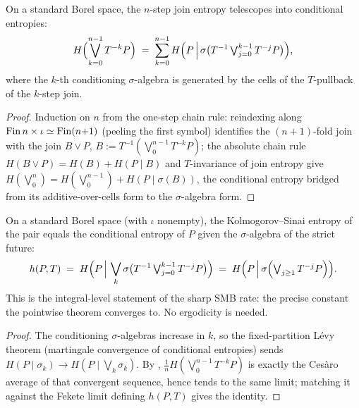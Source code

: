 \begin{theorem}\label{ksEntropySeq_eq_sum_condEntropy}
  \leanok
  On a standard Borel space, the \(n\)-step join entropy telescopes into conditional entropies:
  \[
    H\Bigl(\bigvee_{k=0}^{n-1} T^{-k}P\Bigr)
      \;=\; \sum_{k=0}^{n-1}
        H\Bigl(P \,\Big|\, \sigma\bigl(T^{-1}\textstyle\bigvee_{j=0}^{k-1} T^{-j}P\bigr)\Bigr),
  \]
  where the \(k\)-th conditioning \(\sigma\)-algebra is generated by the cells of the
  \(T\)-pullback of the \(k\)-step join.
\end{theorem}
\begin{proof}\leanok
  Induction on \(n\) from the one-step chain rule: reindexing along
  \(\operatorname{Fin} n \times \iota \simeq \operatorname{Fin}(n{+}1)\) (peeling the first symbol) identifies the
  \((n{+}1)\)-fold join with the join \(B \vee P\), \(B := T^{-1}(\bigvee_0^{n-1}T^{-k}P)\); the
  absolute chain rule \(H(B \vee P) = H(B) + H(P \mid B)\) and \(T\)-invariance of join entropy
  give \(H(\bigvee_0^{n}) = H(\bigvee_0^{n-1}) + H(P \mid \sigma(B))\), the conditional entropy
  bridged from its additive-over-cells form to the \(\sigma\)-algebra form.
\end{proof}

\begin{theorem}\label{ksEntropyPartition_eq_condEntropy_iSup}
  \leanok
  On a standard Borel space (with \(\iota\) nonempty), the Kolmogorov--Sinai entropy of the pair
  equals the conditional entropy of \(P\) given the \(\sigma\)-algebra of the strict future:
  \[
    h(P,T) \;=\; H\Bigl(P \,\Big|\,
      \bigvee_{k}\sigma\bigl(T^{-1}\textstyle\bigvee_{j=0}^{k-1} T^{-j}P\bigr)\Bigr)
      \;=\; H\Bigl(P \,\Big|\, \sigma\Bigl(\bigvee_{j\ge 1} T^{-j}P\Bigr)\Bigr).
  \]
  This is the integral-level statement of the sharp SMB rate: the precise constant the pointwise
  theorem converges to. No ergodicity is needed.
\end{theorem}
\begin{proof}\leanok
  The conditioning \(\sigma\)-algebras increase in \(k\), so the fixed-partition L\'evy theorem
  (martingale convergence of conditional entropies) sends
  \(H(P \mid \sigma_k) \to H(P \mid \bigvee_k \sigma_k)\). By
  , \(\tfrac1n H(\bigvee_0^{n-1}T^{-k}P)\) is exactly the
  Ces\`aro average of that convergent sequence, hence tends to the same limit; matching it against
  the Fekete limit defining \(h(P,T)\) gives the identity.
\end{proof}

